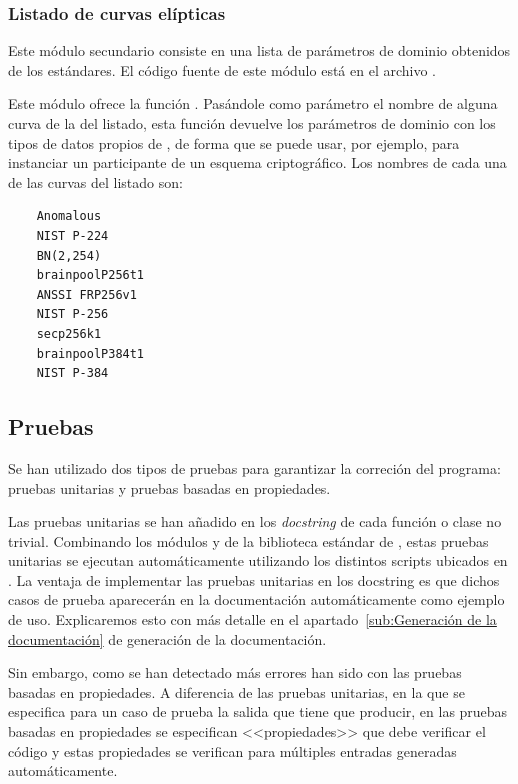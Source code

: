 \subsubsection{Listado de curvas elípticas}
\label{subs:Listado de curvas elípticas}

Este módulo secundario consiste en una lista de parámetros de dominio obtenidos de los estándares. El código fuente de este módulo está en el archivo .

Este módulo ofrece la función . Pasándole como parámetro el nombre de alguna curva de la del listado, esta función devuelve los parámetros de dominio con los tipos de datos propios de , de forma que se puede usar, por ejemplo, para instanciar un participante de un esquema criptográfico. Los nombres de cada una de las curvas del listado son:
\begin{verbatim}
    Anomalous
    NIST P-224
    BN(2,254)
    brainpoolP256t1
    ANSSI FRP256v1
    NIST P-256
    secp256k1
    brainpoolP384t1
    NIST P-384
\end{verbatim}

\subsection{Pruebas}
\label{sub:Pruebas}

Se han utilizado dos tipos de pruebas para garantizar la correción del programa: pruebas unitarias y pruebas basadas en propiedades.

Las pruebas unitarias se han añadido en los \emph{docstring} de cada función o clase no trivial. Combinando los módulos  y  de la biblioteca estándar de , estas pruebas unitarias se ejecutan automáticamente utilizando los distintos scripts ubicados en . La ventaja de implementar las pruebas unitarias en los docstring es que dichos casos de prueba aparecerán en la documentación automáticamente como ejemplo de uso. Explicaremos esto con más detalle en el apartado~\ref{sub:Generación de la documentación} de generación de la documentación.

Sin embargo, como se han detectado más errores han sido con las pruebas basadas en propiedades. A diferencia de las pruebas unitarias, en la que se especifica para un caso de prueba la salida que tiene que producir, en las pruebas basadas en propiedades se especifican <<propiedades>> que debe verificar el código y estas propiedades se verifican para múltiples entradas generadas automáticamente.

